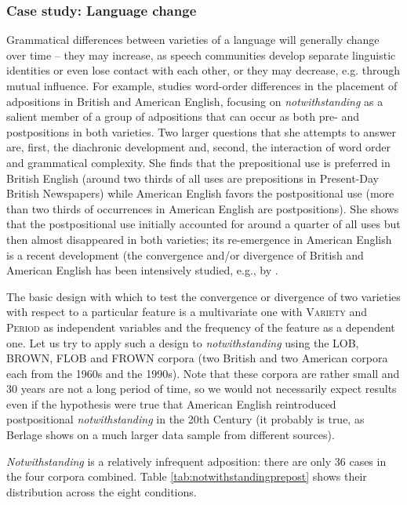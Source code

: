 \subsubsection{Case study: Language change}
\label{sec:languagechange}

Grammatical differences between varieties of a language will generally change over time -- they may increase, as speech communities develop separate linguistic identities or even lose contact with each other, or they may decrease, e.g. through mutual influence. For example, \citet{rohdenburg_prepositions_2009} studies word-order differences in the placement of adpositions in British and American English, focusing on \textit{notwithstanding} as a salient member of a group of adpositions that can occur as both pre- and postpositions in both varieties. Two larger questions that she attempts to answer are, first, the diachronic development and, second, the interaction of word order and grammatical complexity. She finds that the prepositional use is preferred in British English (around two thirds of all uses are prepositions in Present-Day British Newspapers) while American English favors the postpositional use (more than two thirds of occurrences in American English are postpositions). She shows that the postpositional use initially accounted for around a quarter of all uses but then almost disappeared in both varieties; its re-emergence in American English is a recent development (the convergence and/or divergence of British and American English has been intensively studied, e.g., by \citet{hundt_has_1997, rohdenburg_colonial_2009}.

The basic design with which to test the convergence or divergence of two varieties with respect to a particular feature is a multivariate one with \textsc{Variety} and \textsc{Period} as independent variables and the frequency of the feature as a dependent one. Let us try to apply such a design to \textit{notwithstanding} using the LOB, BROWN, FLOB and FROWN corpora (two British and two American corpora each from the 1960s and the 1990s). Note that these corpora are rather small and 30 years are not a long period of time, so we would not necessarily expect results even if the hypothesis were true that American English reintroduced postpositional \textit{notwithstanding} in the 20th Century (it probably is true, as Berlage shows on a much larger data sample from different sources).

\textit{Notwithstanding} is a relatively infrequent adposition: there are only 36 cases in the four corpora combined. Table \ref{tab:notwithstandingprepost} shows their distribution across the eight conditions.

